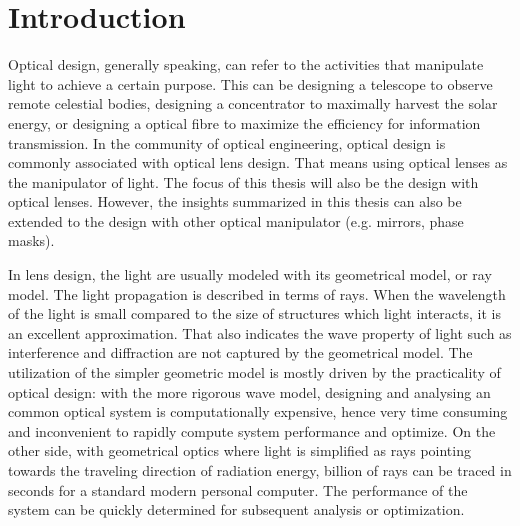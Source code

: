 \chapter{Introduction}
\label{chapter_1_intro}
\graphicspath{ {./chapter-sp/figures/} }
\captionsetup[figure]{labelfont=bf}
\captionsetup{margin=1.5em}
\captionsetup[table]{labelfont=bf}


Optical design, generally speaking, can refer to the activities that manipulate light to achieve a certain purpose. This can be designing a telescope to observe remote celestial bodies, designing a concentrator to maximally harvest the solar energy, or designing a optical fibre to maximize the efficiency for information transmission. In the community of optical engineering, optical design is commonly associated with optical lens design. That means using optical lenses as the manipulator of light. The focus of this thesis will also be the design with optical lenses. However, the insights summarized in this thesis can also be extended to the design with other optical manipulator (e.g. mirrors, phase masks).

In lens design, the light are usually modeled with its geometrical model, or ray model. The light propagation is described in terms of rays. When the wavelength of the light is small compared to the size of structures which light interacts, it is an excellent approximation. That also indicates the wave property of light such as interference and diffraction are not captured by the geometrical model. The utilization of the simpler geometric model is mostly driven by the practicality of optical design: with the more rigorous wave model, designing and analysing an common optical system is computationally expensive, hence   very time consuming and inconvenient to rapidly compute system performance and optimize. On the other side, with geometrical optics where light is simplified as rays pointing towards the traveling direction of radiation energy, billion of rays can be traced in seconds for a standard modern personal computer. The performance of the system can be quickly determined for subsequent analysis or optimization.   


